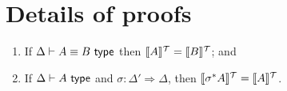 \section{Details of proofs}


\begin{lemma}
  \begin{enumerate}
  \item If $\Delta \vdash A \equiv B \textsf{ type}$ then $\llbracket A \rrbracket^{\mathcal{T}} =
    \llbracket B \rrbracket^{\mathcal{T}}$; and
  \item If $\Delta \vdash A \textsf{ type}$ and $\sigma : \Delta' \Rightarrow
    \Delta$, then $\llbracket \sigma^*A \rrbracket^{\mathcal{T}} = \llbracket A \rrbracket^{\mathcal{T}}$.
  \end{enumerate}
\end{lemma}
